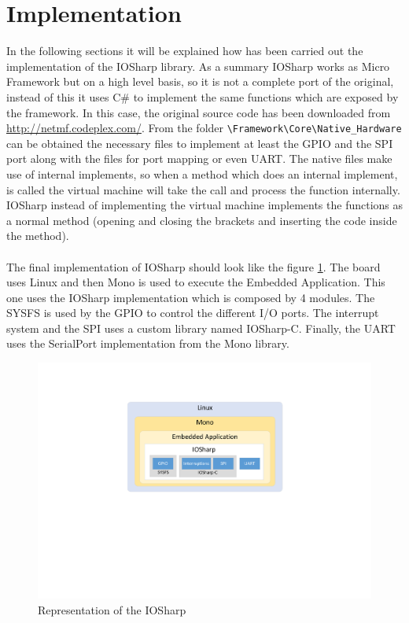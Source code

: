 \section{Implementation}\label{S:Implementation}
In the following sections it will be explained how has been carried out the implementation of the IOSharp library. As a summary IOSharp works as Micro Framework but on a high level basis, so it is not a complete port of the original, instead of this it uses C\# to implement the same functions which are exposed by the framework. In this case, the original source code has been downloaded from \url{http://netmf.codeplex.com/}. From the folder \verb!\Framework\Core\Native_Hardware! can be obtained the necessary files to implement at least the GPIO and the SPI port along with the files for port mapping or even UART. The native files make use of internal implements, so when a method which does an internal implement, is called the virtual machine will take the call and process the function internally. IOSharp instead of implementing the virtual machine implements the functions as a normal method (opening and closing the brackets and inserting the code inside the method).
\\
\\
The final implementation of IOSharp should look like the figure \ref{fig:iosharp-schema}. The board uses Linux and then Mono is used to execute the Embedded Application. This one uses the IOSharp implementation which is composed by 4 modules. The SYSFS is used by the GPIO to control the different I/O ports. The interrupt system and the SPI uses a custom library named IOSharp-C. Finally, the UART uses the SerialPort implementation from the Mono library.
\begin{figure}[H]\begin{center}
 \centering
  \captionsetup{justification=centering}
  \includegraphics[scale=0.75]{pictures/iosharp/iosharp-schema2}
  \caption{Representation of the IOSharp \label{fig:iosharp-schema}}
\end{center}\end{figure}

